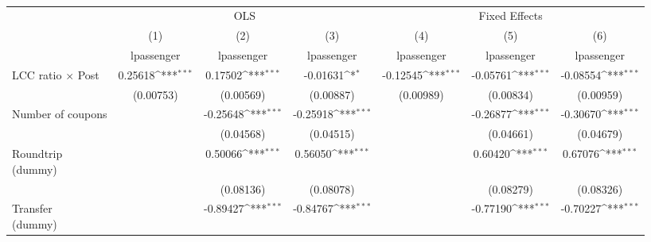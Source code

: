\begin{table}[htbp]\centering
\def\sym#1{\ifmmode^{#1}\else\(^{#1}\)\fi}
\caption{ \label{post4passenger\_nonASVX}}
\begin{tabular}{l*{6}{c}}
\toprule
                    &\multicolumn{3}{c}{OLS}                                          &\multicolumn{3}{c}{Fixed Effects}                                \\\cmidrule(lr){2-4}\cmidrule(lr){5-7}
                    &\multicolumn{1}{c}{(1)}&\multicolumn{1}{c}{(2)}&\multicolumn{1}{c}{(3)}&\multicolumn{1}{c}{(4)}&\multicolumn{1}{c}{(5)}&\multicolumn{1}{c}{(6)}\\
                    &\multicolumn{1}{c}{lpassenger}&\multicolumn{1}{c}{lpassenger}&\multicolumn{1}{c}{lpassenger}&\multicolumn{1}{c}{lpassenger}&\multicolumn{1}{c}{lpassenger}&\multicolumn{1}{c}{lpassenger}\\
\midrule
LCC ratio $\times$ Post&     0.25618\sym{***}&     0.17502\sym{***}&    -0.01631\sym{*}  &    -0.12545\sym{***}&    -0.05761\sym{***}&    -0.08554\sym{***}\\
                    &   (0.00753)         &   (0.00569)         &   (0.00887)         &   (0.00989)         &   (0.00834)         &   (0.00959)         \\
\addlinespace
Number of coupons   &                     &    -0.25648\sym{***}&    -0.25918\sym{***}&                     &    -0.26877\sym{***}&    -0.30670\sym{***}\\
                    &                     &   (0.04568)         &   (0.04515)         &                     &   (0.04661)         &   (0.04679)         \\
\addlinespace
\shortstack{Roundtrip \\ (dummy)}&                     &     0.50066\sym{***}&     0.56050\sym{***}&                     &     0.60420\sym{***}&     0.67076\sym{***}\\
                    &                     &   (0.08136)         &   (0.08078)         &                     &   (0.08279)         &   (0.08326)         \\
\addlinespace
\shortstack{Transfer \\ (dummy)}&                     &    -0.89427\sym{***}&    -0.84767\sym{***}&                     &    -0.77190\sym{***}&    -0.70227\sym{***}\\

\end{tabular}
\end{table}
